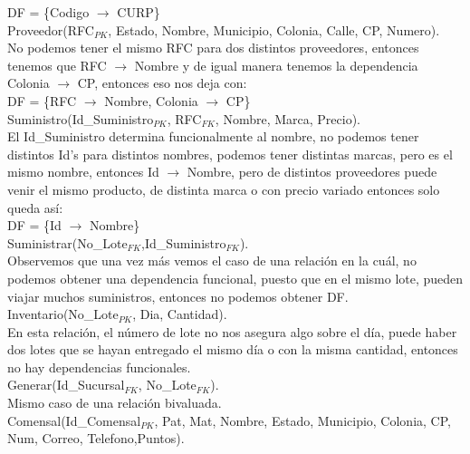 \documentclass[11pt,letterpaper]{article}
\begin{document}
DF = \{Codigo \(\rightarrow\) CURP\}\\

Proveedor(RFC\(_{PK}\), Estado, Nombre, Municipio, Colonia, Calle, CP, Numero).\\

No podemos tener el mismo RFC para dos distintos proveedores, entonces tenemos que RFC \(\rightarrow\) Nombre y de igual manera tenemos la dependencia Colonia \(\rightarrow\) CP, entonces eso nos deja con:\\

DF = \{RFC \(\rightarrow\) Nombre, Colonia \(\rightarrow\) CP\}\\

Suministro(Id\_Suministro\(_{PK}\), RFC\(_{FK}\), Nombre, Marca, Precio).\\

El Id\_Suministro determina funcionalmente al nombre, no podemos tener distintos Id's para distintos nombres, podemos tener distintas marcas, pero es el mismo nombre, entonces Id \(\rightarrow\) Nombre, pero de distintos proveedores puede venir el mismo producto, de distinta marca o con precio variado entonces solo queda así:\\

DF = \{Id \(\rightarrow\) Nombre\}\\

Suministrar(No\_Lote\(_{FK}\),Id\_Suministro\(_{FK}\)).\\

Observemos que una vez más vemos el caso de una relación en la cuál, no podemos obtener una dependencia funcional, puesto que en el mismo lote, pueden viajar muchos suministros, entonces no podemos obtener DF.\\

Inventario(No\_Lote\(_{PK}\), Dia, Cantidad).\\

En esta relación, el número de lote no nos asegura algo sobre el día, puede haber dos lotes que se hayan entregado el mismo día o con la misma cantidad, entonces no hay dependencias funcionales.\\

Generar(Id\_Sucursal\(_{FK}\), No\_Lote\(_{FK}\)).\\

Mismo caso de una relación bivaluada.\\

Comensal(Id\_Comensal\(_{PK}\), Pat, Mat, Nombre, Estado, Municipio, Colonia, CP, Num, Correo, Telefono,Puntos).\\
\end{document}
